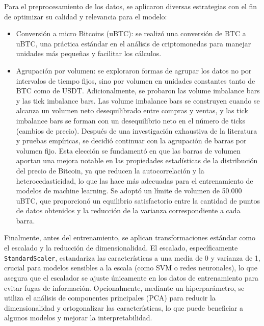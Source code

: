 Para el preprocesamiento de los datos, se aplicaron diversas estrategias con el fin de optimizar su calidad y relevancia para el modelo:

\begin{itemize}
    \item Conversión a micro Bitcoins (uBTC): se realizó una conversión de BTC a uBTC, una práctica estándar en el análisis de criptomonedas para manejar unidades más pequeñas y facilitar los cálculos.
    \item Agrupación por volumen: se exploraron formas de agrupar los datos no por intervalos de tiempo fijos, sino por volumen en unidades constantes tanto de BTC como de USDT. Adicionalmente, se probaron las volume imbalance bars y las tick imbalance bars. Las volume imbalance bars se construyen cuando se alcanza un volumen neto desequilibrado entre compras y ventas, y las tick imbalance bars se forman con un desequilibrio neto en el número de ticks (cambios de precio). Después de una investigación exhaustiva de la literatura y pruebas empíricas, se decidió continuar con la agrupación de barras por volumen fijo. Esta elección se fundamentó en que las barras de volumen aportan una mejora notable en las propiedades estadísticas de la distribución del precio de Bitcoin, ya que reducen la autocorrelación y la heterocedasticidad, lo que las hace más adecuadas para el entrenamiento de modelos de machine learning. Se adoptó un límite de volumen de 50.000 uBTC, que proporcionó un equilibrio satisfactorio entre la cantidad de puntos de datos obtenidos y la reducción de la varianza correspondiente a cada barra.
\end{itemize}

Finalmente, antes del entrenamiento, se aplican transformaciones estándar como el escalado y la reducción de dimensionalidad. El escalado, específicamente \texttt{StandardScaler}, estandariza las características a una media de 0 y varianza de 1, crucial para modelos sensibles a la escala (como SVM o redes neuronales), lo que asegura  que el escalador se ajuste únicamente en los datos de entrenamiento para evitar fugas de información. Opcionalmente, mediante un hiperparámetro,  se utiliza el análisis de componentes principales (PCA) para reducir la dimensionalidad y ortogonalizar las características, lo que puede beneficiar a algunos modelos y mejorar la interpretabilidad.

